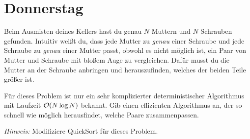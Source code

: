 \documentclass{uebung_cs}
\begin{document}
\newpage
\section*{Donnerstag}

\begin{aufgabe}
	Beim Ausmisten deines Kellers hast du genau $N$ Muttern und $N$ Schrauben gefunden.
	Intuitiv weißt du, dass jede Mutter zu \emph{genau} einer Schraube und jede Schraube zu \emph{genau} einer Mutter passt, obwohl es nicht möglich ist, ein Paar von Mutter und Schraube mit bloßem Auge zu vergleichen. 
	Dafür musst du die Mutter an der Schraube anbringen und herauszufinden, welches der beiden Teile größer ist. 

	Für dieses Problem ist nur ein sehr komplizierter deterministischer Algorithmus mit Laufzeit $\mathcal{O}(N \log N)$ bekannt. 
	Gib einen effizienten Algorithmus an, der so schnell wie möglich herausfindet, welche Paare zusammenpassen. 
	
	\textit{Hinweis:} Modifiziere QuickSort für dieses Problem.
\end{aufgabe}
\end{document}
